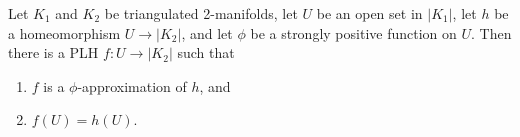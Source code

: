 Let $K_1$ and $K_2$ be triangulated 2-manifolds, let $U$ be an open set in $|K_1|$, let $h$ be a homeomorphism $U \rightarrow |K_2|$, and let $\phi$ be a strongly positive function on $U$. Then there is a PLH $f: U \rightarrow |K_2|$ such that
\begin{enumerate}
\item $f$ is a $\phi$-approximation of $h$, and
\item $f(U) = h(U)$.
\end{enumerate}
